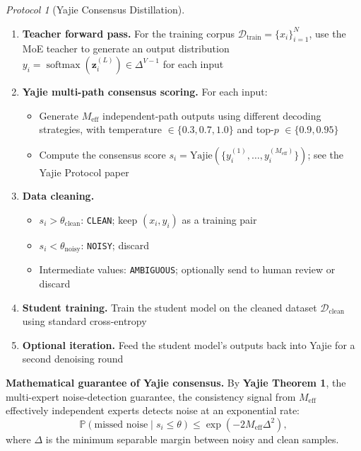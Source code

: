 \documentclass[12pt,a4paper]{article}
\theoremstyle{remark}
\newtheorem{protocol}[theorem]{Protocol}
\newcommand{\Pbb}{\mathbb{P}}
\newcommand{\D}{\mathcal{D}}
\DeclareMathOperator{\softmax}{softmax}
\begin{document}
\begin{protocol}[Yajie Consensus Distillation]
\label{prot:yajie_distill}
\begin{enumerate}
    \item \textbf{Teacher forward pass.} For the training corpus $\D_{\text{train}} = \{x_i\}_{i=1}^{N}$, use the MoE teacher to generate an output distribution $y_i = \softmax(\mathbf{z}_i^{(L)}) \in \Delta^{V-1}$ for each input
    \item \textbf{Yajie multi-path consensus scoring.} For each input:
    \begin{itemize}
        \item Generate $M_{\text{eff}}$ independent-path outputs using different decoding strategies, with temperature $\in \{0.3, 0.7, 1.0\}$ and top-$p$ $\in \{0.9, 0.95\}$
        \item Compute the consensus score $s_i = \text{Yajie}(\{y_i^{(1)}, \ldots, y_i^{(M_{\text{eff}})}\})$; see the Yajie Protocol paper
    \end{itemize}
    \item \textbf{Data cleaning.}
    \begin{itemize}
        \item $s_i > \theta_{\text{clean}}$: \texttt{CLEAN}; keep $(x_i, y_i)$ as a training pair
        \item $s_i < \theta_{\text{noisy}}$: \texttt{NOISY}; discard
        \item Intermediate values: \texttt{AMBIGUOUS}; optionally send to human review or discard
    \end{itemize}
    \item \textbf{Student training.} Train the student model on the cleaned dataset $\D_{\text{clean}}$ using standard cross-entropy
    \item \textbf{Optional iteration.} Feed the student model's outputs back into Yajie for a second denoising round
\end{enumerate}
\end{protocol}

\textbf{Mathematical guarantee of Yajie consensus.} By \textbf{Yajie Theorem 1}, the multi-expert noise-detection guarantee, the consistency signal from $M_{\text{eff}}$ effectively independent experts detects noise at an exponential rate:
\begin{equation}
    \Pbb(\text{missed noise} \mid s_i \leq \theta) \leq \exp(-2 M_{\text{eff}} \Delta^2),
\end{equation}
where $\Delta$ is the minimum separable margin between noisy and clean samples.
\end{document}
